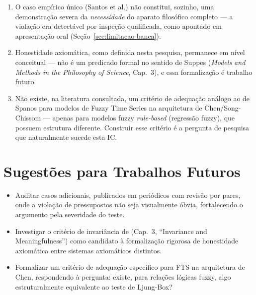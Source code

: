 \documentclass[
    12pt,
    oneside,
    openany,
    a4paper,
    english,
    brazil
]{abntex2}
\theoremstyle{definition}
\begin{document}
\begin{enumerate}
    \item O caso empírico único (Santos et al.) não constitui, sozinho, uma demonstração severa da \textit{necessidade} do aparato filosófico completo --- a violação era detectável por inspeção qualificada, como apontado em apresentação oral (Seção~\ref{sec:limitacao-banca}).

    \item Honestidade axiomática, como definida nesta pesquisa, permanece em nível conceitual --- não é um predicado formal no sentido de Suppes (\textit{Models and Methods in the Philosophy of Science}, Cap.~3), e essa formalização é trabalho futuro.

    \item Não existe, na literatura consultada, um critério de adequação análogo ao de Spanos para modelos de Fuzzy Time Series na arquitetura de Chen/Song-Chissom --- apenas para modelos fuzzy \textit{rule-based} (regressão fuzzy), que possuem estrutura diferente. Construir esse critério é a pergunta de pesquisa que naturalmente sucede esta IC.
\end{enumerate}

\section{Sugestões para Trabalhos Futuros}
\label{sec:futuros}

\begin{itemize}
    \item Auditar casos adicionais, publicados em periódicos com revisão por pares, onde a violação de pressupostos não seja visualmente óbvia, fortalecendo o argumento pela severidade do teste.

    \item Investigar o critério de invariância de  (Cap.~3, ``Invariance and Meaningfulness'') como candidato à formalização rigorosa de honestidade axiomática entre sistemas axiomáticos distintos.

    \item Formalizar um critério de adequação específico para FTS na arquitetura de Chen, respondendo à pergunta: existe, para relações lógicas fuzzy, algo estruturalmente equivalente ao teste de Ljung-Box?
\end{itemize}
\end{document}
